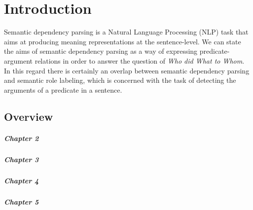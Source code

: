 \chapter{Introduction}
\label{chap:introduction}

Semantic dependency parsing is a Natural Language Processing (NLP) task that aims at producing 
meaning representations at the sentence-level. We can state the aims of semantic dependency parsing
as a way of expressing predicate-argument relations in order to answer the question of
\textit{Who did What to Whom}. In this regard there is certainly an overlap between semantic dependency
parsing and semantic role labeling, which is concerned with the task of detecting the arguments of a 
predicate in a sentence. 

\section{Overview} 

\paragraph{Chapter 2} 

\paragraph{Chapter 3} 

\paragraph{Chapter 4} 

\paragraph{Chapter 5} 